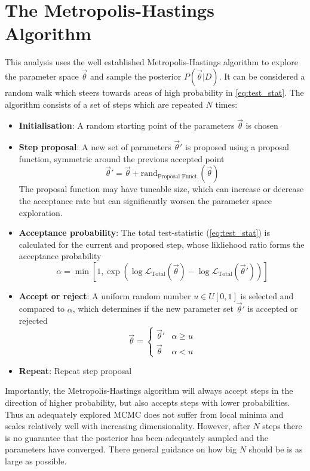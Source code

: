 \section{The Metropolis-Hastings Algorithm}
This analysis uses the well established Metropolis-Hastings algorithm\cite{metropolis,hastings} to explore the parameter space $\vec{\theta}$ and sample the posterior $P(\vec{\theta}|D)$. It can be considered a random walk which steers towards areas of high probability in \autoref{eq:test_stat}. The algorithm consists of a set of steps which are repeated $N$ times:
\begin{itemize}
	\item \textbf{Initialisation}: A random starting point of the parameters $\vec{\theta}$ is chosen
	\item \textbf{Step proposal}: A new set of parameters $\vec{\theta}'$ is proposed using a proposal function, symmetric around the previous accepted point
	\begin{equation}
		\vec{\theta}' = \vec{\theta}+\text{rand}_{\text{Proposal Funct.}}(\vec{\theta})
	\end{equation}
	The proposal function may have tuneable size, which can increase or decrease the acceptance rate but can significantly worsen the parameter space exploration.
	\item \textbf{Acceptance probability}: The total test-statistic (\autoref{eq:test_stat}) is calculated for the current and proposed step, whose likliehood ratio forms the acceptance probability
	\begin{equation}
		\alpha = \min \left[ 1, \exp\left(\log\mathcal{L}_\text{Total}(\vec{\theta}) - \log\mathcal{L}_\text{Total}(\vec{\theta}') \right)\right]
	\end{equation}
	\item \textbf{Accept or reject}: A uniform random number $u \in U[0,1]$ is selected and compared to $\alpha$, which determines if the new parameter set $\vec{\theta}'$ is accepted or rejected
	\begin{equation}
	\vec{\theta} =
	\begin{cases}
		\vec{\theta}' & \alpha \ge u \\
		\vec{\theta} & \alpha < u
	\end{cases}
	\end{equation}
	\item \textbf{Repeat}: Repeat step proposal
\end{itemize}
Importantly, the Metropolis-Hastings algorithm will always accept steps in the direction of higher probability, but also accepts steps with lower probabilities. Thus an adequately explored MCMC does not suffer from local minima and scales relatively well with increasing dimensionality. However, after $N$ steps there is no guarantee that the posterior has been adequately sampled and the parameters have converged. There general guidance on how big $N$ should be is as large as possible\cite{mcmc_handbook}.

